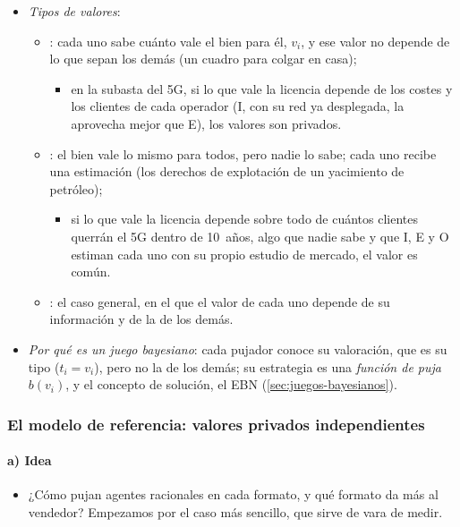 \documentclass[11pt]{article}
\begin{document}
\begin{itemize}
\item \emph{Tipos de valores}:
  \begin{itemize}
  \item {}: cada uno sabe cuánto vale el bien para él, $v_i$, y ese valor no depende de lo que sepan los demás (un cuadro para colgar en casa);
    \begin{itemize}
    \item en la subasta del 5G, si lo que vale la licencia depende de los costes y los clientes de cada operador (\textup{I}, con su red ya desplegada, la aprovecha mejor que E), los valores son privados.
    \end{itemize}
  \item {}: el bien vale lo mismo para todos, pero nadie lo sabe; cada uno recibe una estimación (los derechos de explotación de un yacimiento de petróleo);
    \begin{itemize}
    \item si lo que vale la licencia depende sobre todo de cuántos clientes querrán el 5G dentro de 10~años, algo que nadie sabe y que \textup{I}, E y O estiman cada uno con su propio estudio de mercado, el valor es común.
    \end{itemize}
  \item {}: el caso general, en el que el valor de cada uno depende de su información y de la de los demás\nocite{MilgromWeber1982Theory}.
  \end{itemize}
\item \emph{Por qué es un juego bayesiano}: cada pujador conoce su valoración, que es su tipo ($t_i=v_i$), pero no la de los demás; su estrategia es una \emph{función de puja} $b(v_i)$, y el concepto de solución, el EBN (\ref{sec:juegos-bayesianos}).
\end{itemize}

\subsubsection{El modelo de referencia: valores privados independientes}\label{sec:ipv}

\paragraph{a) Idea}

\begin{itemize}
\item ¿Cómo pujan agentes racionales en cada formato, y qué formato da más al vendedor? Empezamos por el caso más sencillo, que sirve de vara de medir\nocite{Krishna2010Auction,Klemperer2004Auctions}.
\end{itemize}
\end{document}
